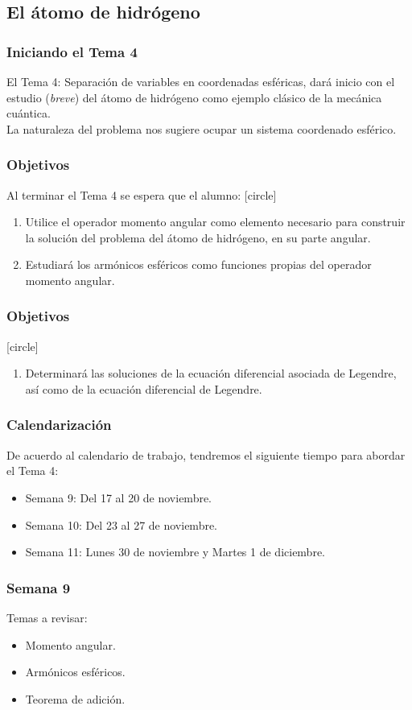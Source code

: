\subsection{El átomo de hidrógeno}
\begin{frame}
\frametitle{Iniciando el Tema 4}
El Tema 4: Separación de variables en coordenadas esféricas, dará inicio con el estudio (\emph{breve}) del átomo de hidrógeno como ejemplo clásico de la mecánica cuántica.
\\
\bigskip
\pause
La naturaleza del problema nos sugiere ocupar un sistema coordenado esférico.
\end{frame}
\begin{frame}
\frametitle{Objetivos}
Al terminar el Tema 4 se espera que el alumno:
[circle]
\begin{enumerate}[<+->]
\item Utilice el operador momento angular como elemento necesario para construir la solución del problema del átomo de hidrógeno, en su parte angular.
\item Estudiará los armónicos esféricos como funciones propias del operador momento angular.
\seti
\end{enumerate}
\end{frame}
\begin{frame}
\frametitle{Objetivos}
[circle]
\begin{enumerate}[<+->]
\conti
\item Determinará las soluciones de la ecuación diferencial asociada de Legendre, así como de la ecuación diferencial de Legendre.
\end{enumerate}
\end{frame}
\begin{frame}
\frametitle{Calendarización}
De acuerdo al calendario de trabajo, tendremos el siguiente tiempo para abordar el Tema 4:
\begin{itemize}
\item Semana 9: Del 17 al 20 de noviembre.
\item Semana 10: Del 23 al 27 de noviembre.
\item Semana 11:  Lunes 30 de noviembre y Martes 1 de diciembre.
\end{itemize}
\end{frame}
\begin{frame}
\frametitle{Semana 9}
Temas a revisar:
\begin{itemize}
\item Momento angular.
\item Armónicos esféricos.
\item Teorema de adición.
\end{itemize}
\end{frame}
